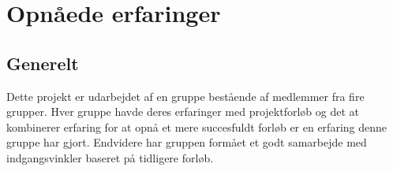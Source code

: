 \section{Opnåede erfaringer}
\label{ch:OpXP}

\subsection{Generelt}
Dette projekt er udarbejdet af en gruppe bestående af medlemmer fra fire grupper. Hver gruppe havde deres erfaringer med projektforløb og det at kombinerer erfaring for at opnå et mere succesfuldt forløb er en erfaring denne gruppe har gjort. Endvidere har gruppen formået et godt samarbejde med indgangsvinkler baseret på tidligere forløb.

